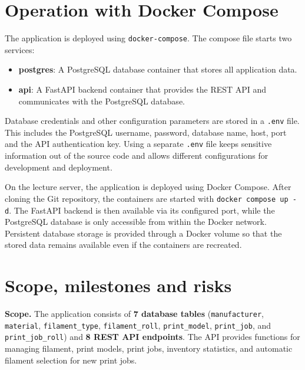 \documentclass[11pt,a4paper]{article}
\begin{document}
\section{Operation with Docker Compose}

The application is deployed using \texttt{docker-compose}. The compose file
starts two services:

\begin{itemize}
    \item \textbf{postgres}: A PostgreSQL database container that stores all
    application data.
    \item \textbf{api}: A FastAPI backend container that provides the REST API
    and communicates with the PostgreSQL database.
\end{itemize}

Database credentials and other configuration parameters are stored in a
\texttt{.env} file. This includes the PostgreSQL username, password, database
name, host, port and the API authentication key. Using a separate
\texttt{.env} file keeps sensitive information out of the source code and
allows different configurations for development and deployment.

On the lecture server, the application is deployed using Docker Compose. After
cloning the Git repository, the containers are started with
\texttt{docker compose up -d}. The FastAPI backend is then available via its
configured port, while the PostgreSQL database is only accessible from within
the Docker network. Persistent database storage is provided through a Docker
volume so that the stored data remains available even if the containers are
recreated.

\section{Scope, milestones and risks}

\textbf{Scope.}
The application consists of \textbf{7 database tables} (\texttt{manufacturer},
\texttt{material}, \texttt{filament\_type}, \texttt{filament\_roll},
\texttt{print\_model}, \texttt{print\_job}, and
\texttt{print\_job\_roll}) and \textbf{8 REST API endpoints}. The API provides
functions for managing filament, print models, print jobs, inventory
statistics, and automatic filament selection for new print jobs.
\end{document}
